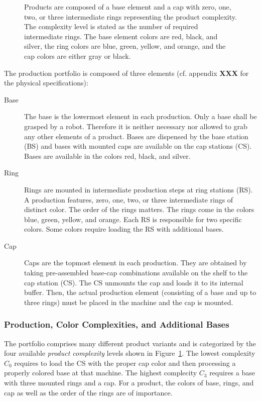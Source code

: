 \documentclass[12pt,twoside]{article}
\newcommand{\reffig}[1]{Figure~\ref{#1}}
\begin{document}
\begin{figure}
{}{%
  \caption{Products are composed of a base element and a cap with
    zero, one, two, or three intermediate rings representing the
    product complexity. The complexity level is stated as the number of
    required intermediate rings. The base element colors are red,
    black, and silver, the ring colors are blue, green, yellow, and
    orange, and the cap colors are either gray or black.}
  \label{fig:production-complexities}
}
\vspace{-1mm}
\end{figure}
The production portfolio is composed of three elements (cf. appendix
\textbf{XXX} for the physical specifications):
\begin{description}
\item[Base] The base is the lowermost element in each production. Only
  a base shall be grasped by a robot. Therefore it is neither
  necessary nor allowed to grab any other elements of a product. Bases
  are dispensed by the base station (BS) and bases with mounted caps
  are available on the cap stations (CS). Bases are available in the
  colors red, black, and silver.
\item[Ring] Rings are mounted in intermediate production steps at ring
  stations (RS). A production features, zero, one, two, or three
  intermediate rings of distinct color. The order of the rings
  matters. The rings come in the colors blue, green, yellow, and
  orange. Each RS is responsible for two specific colors. Some colors
  require loading the RS with additional bases.
\item[Cap] Caps are the topmost element in each production. They are
  obtained by taking pre-assembled base-cap combinations available on
  the shelf to the cap station (CS). The CS unmounts the cap and loads
  it to its internal buffer. Then, the actual production element
  (consisting of a base and up to three rings) must be placed in the
  machine and the cap is mounted.
\end{description}

\subsubsection{Production, Color Complexities, and Additional Bases}
\label{sec:production-complexities}
The portfolio comprises many different product variants and is
categorized by the four available \emph{product complexity} levels
shown in \reffig{fig:production-complexities}. The lowest complexity
$C_0$ requires to load the CS with the proper cap color and then
processing a properly colored base at that machine. The highest
complecity $C_3$ requires a base with three mounted rings and a
cap. For a product, the colors of base, rings, and cap as well as the
order of the rings are of importance.
\end{document}
